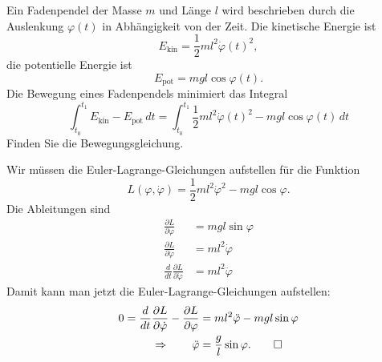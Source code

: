 Ein Fadenpendel der Masse $m$ und Länge $l$ wird beschrieben durch
die Auslenkung $\varphi(t)$ in Abhängigkeit von der Zeit. 
Die kinetische Energie ist 
\[
E_{\text{kin}}
=
\frac12ml^2\dot\varphi(t)^2,
\]
die potentielle Energie ist
\[
E_{\text{pot}}
=
mgl\cos\varphi(t).
\]
Die Bewegung eines Fadenpendels minimiert das Integral
\[
\int_{t_0}^{t_1}
E_{\text{kin}}-E_{\text{pot}}
\,dt
=
\int_{t_0}^{t_1}
\frac12ml^2\dot\varphi(t)^2
-
mgl\cos\varphi(t)
\,dt
\]
Finden Sie die Bewegungsgleichung.

\begin{loesung}
Wir müssen die Euler-Lagrange-Gleichungen aufstellen für die
Funktion
\[
L(\varphi, \dot\varphi)
=
\frac12ml^2\dot\varphi^2
-
mgl\cos\varphi.
\]
Die Ableitungen sind
\begin{align*}
\frac{\partial L}{\partial\varphi}
&=
mgl\sin\varphi
\\
\frac{\partial L}{\partial\dot\varphi}
&=
ml^2\dot\varphi
\\
\frac{d}{dt}
\frac{\partial L}{\partial\dot\varphi}
&=
ml^2\ddot\varphi
\end{align*}
Damit kann man jetzt die Euler-Lagrange-Gleichungen aufstellen:
\begin{align*}
0=
\frac{d}{dt}
\frac{\partial L}{\partial\dot\varphi}
-
\frac{\partial L}{\partial\varphi}
&=
ml^2\ddot\varphi
-
mgl\sin\varphi
\\
\Rightarrow\qquad
\ddot\varphi
&=
\frac{g}{l}\sin\varphi.
\qedhere
\end{align*}
\end{loesung}


